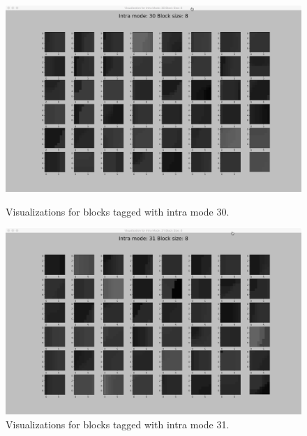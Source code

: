 \begin{figure}
        \vspace*{1cm} %
    
        \begin{minipage}{0.49\textwidth}
            \includegraphics[width=\linewidth]{Figures/visu-size8x8/8-30}
            \caption[Visualizations for blocks tagged with intra mode 30]{Visualizations for blocks tagged with intra mode 30.}
            \label{fig:size8_mode30}
        \end{minipage}
        \hspace{\fill} %
        \begin{minipage}{0.49\textwidth}
            \includegraphics[width=\linewidth]{Figures/visu-size8x8/8-31}
            \caption[Visualizations for blocks tagged with intra mode 31]{Visualizations for blocks tagged with intra mode 31.}
            \label{fig:size8_mode31}
        \end{minipage}
        

\end{figure}
